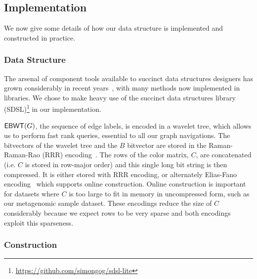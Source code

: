 \subsection{Implementation}
\label{subsec:implementation}

We now give some details of how our data structure is implemented and constructed in practice.

\subsubsection{Data Structure}

The arsenal of component tools available to succinct data structures designers has grown considerably in recent years~\citep{Navarro16}, with many methods now implemented in libraries. We chose to make heavy use of the succinct data structures library (SDSL)\footnote{\url{https://github.com/simongog/sdsl-lite}} 
in our implementation.

\(\mathsf{EBWT} (G)\), the sequence of edge labels, is encoded in a wavelet tree, which allows us to perform fast rank queries, essential to all our graph navigations. The bitvectors of the wavelet tree  and the $B$ bitvector are stored in the Raman-Raman-Rao (RRR) encoding~\citep{RRR07}.
The rows of the color matrix, $C$, are concatenated (i.e. $C$ is stored in row-major order) and this single long bit string is then compressed.  It is either stored with RRR encoding,  or alternately Elias-Fano encoding~\citep{elias1974efficient,fano1971number,bitvector} which supports online construction.  Online construction is important for datasets where $C$ is too large to fit in memory in uncompressed form, such as our metagenomic sample dataset.  These encodings reduce the size of $C$ considerably because we expect rows to be very sparse
and both encodings exploit this sparseness. 

\subsubsection{Construction}

